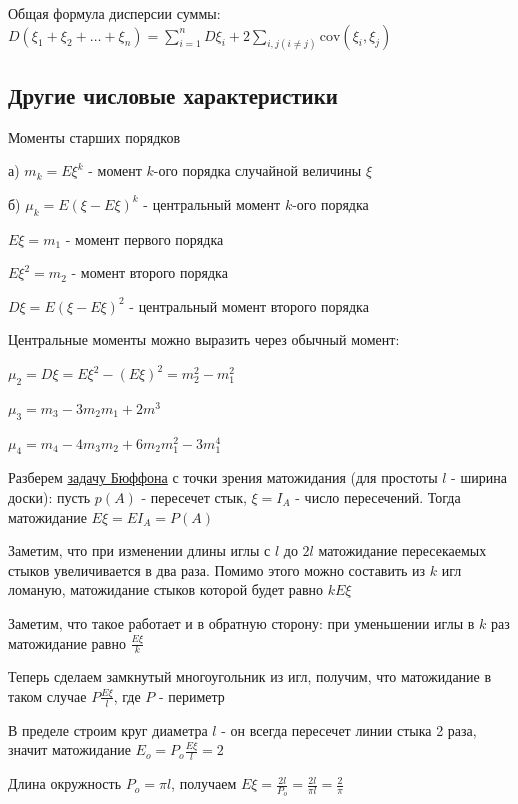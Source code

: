 \documentclass[12pt]{article}
\begin{document}
     Общая формула дисперсии суммы: $D(\xi_1 + \xi_2 + \dots + \xi_n) = \sum_{i = 1}^n D \xi_i + 2\sum_{i, j (i \neq j)} \mathrm{cov} (\xi_i, \xi_j)$

    \subsection{Другие числовые характеристики}

    Моменты старших порядков

    а) $m_k = E\xi^k$ - момент $k$-ого порядка случайной величины $\xi$

    б) $\mu_k = E(\xi - E\xi)^k$ - центральный момент $k$-ого порядка

    $E\xi = m_1$ - момент первого порядка

    $E\xi^2 = m_2$ - момент второго порядка

    $D\xi = E(\xi - E\xi)^2$ - центральный момент второго порядка

    \Nota Центральные моменты можно выразить через обычный момент:

    $\mu_2 = D\xi = E\xi^2 - (E\xi)^2 = m_2^2 - m_1^2$

    $\mu_3 = m_3 - 3m_2 m_1 + 2m^3$

    $\mu_4 = m_4 - 4m_3 m_2 + 6m_2 m_1^2 - 3m_1^4$

    \Ex Разберем \hyperlink{buffonsproblem}{задачу Бюффона} с точки зрения матожидания (для простоты $l$ - ширина доски): пусть $p(A)$ - пересечет стык,
    $\xi = I_A$ - число пересечений. Тогда матожидание $E\xi = E I_A = P(A)$

    Заметим, что при изменении длины иглы с $l$ до $2l$ матожидание пересекаемых стыков увеличивается
    в два раза. Помимо этого можно составить из $k$ игл ломаную, матожидание стыков которой будет равно $kE\xi$

    Заметим, что такое работает и в обратную сторону: при уменьшении иглы в $k$ раз матожидание равно $\frac{E\xi}{k}$

    Теперь сделаем замкнутый многоугольник из игл, получим, что матожидание в таком случае $P\frac{E\xi}{l}$, где $P$ - периметр

    В пределе строим круг диаметра $l$ - он всегда пересечет линии стыка 2 раза, значит матожидание $E_o = P_o\frac{E\xi}{l} = 2$

    Длина окружность $P_o = \pi l$, получаем $E\xi = \frac{2l}{P_o} = \frac{2l}{\pi l} = \frac{2}{\pi}$
\end{document}
